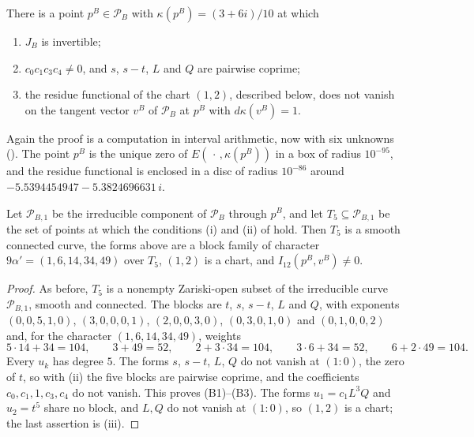 \begin{proposition}\label{prop:family52b}
There is a point $p^{B}\in\mathcal P_{B}$ with $\kappa(p^{B})=(3+6i)/10$ at
which
\begin{enumerate}[label=\textup{(\roman*)}]
\item $J_{B}$ is invertible;
\item $c_{0}c_{1}c_{3}c_{4}\ne0$, and $s$, $s-t$, $L$ and $Q$ are pairwise
coprime;
\item the residue functional of the chart $(1,2)$, described below, does
not vanish on the tangent vector $v^{B}$ of $\mathcal P_{B}$ at $p^{B}$ with
$d\kappa(v^{B})=1$.
\end{enumerate}
\end{proposition}

Again the proof is a computation in interval arithmetic, now with six
unknowns (). The point $p^{B}$ is the unique zero of
$E(\,\cdot\,,\kappa(p^{B}))$ in a box of radius $10^{-95}$, and the residue
functional is enclosed in a disc of radius $10^{-86}$ around
$-5.5394454947-5.3824696631\,i$.

\begin{corollary}\label{cor:family52b}
Let $\mathcal P_{B,1}$ be the irreducible component of $\mathcal P_{B}$
through $p^{B}$, and let $T_{5}\subseteq\mathcal P_{B,1}$ be the set of
points at which the conditions \textup{(i)} and \textup{(ii)} of
 hold. Then $T_{5}$ is a smooth connected curve, the
forms above are a block family of character $9\alpha'=(1,6,14,34,49)$ over
$T_{5}$, $(1,2)$ is a chart, and $I_{12}(p^{B},v^{B})\ne0$.
\end{corollary}

\begin{proof}
As before, $T_{5}$ is a nonempty Zariski-open subset of the irreducible
curve $\mathcal P_{B,1}$, smooth and connected. The blocks are $t$, $s$,
$s-t$, $L$ and $Q$, with exponents $(0,0,5,1,0)$, $(3,0,0,0,1)$,
$(2,0,0,3,0)$, $(0,3,0,1,0)$ and $(0,1,0,0,2)$ and, for the character
$(1,6,14,34,49)$, weights
\[
  5\cdot14+34=104,\qquad 3+49=52,\qquad 2+3\cdot34=104,\qquad 3\cdot6+34=52,
  \qquad 6+2\cdot49=104 .
\]
Every $u_{k}$ has degree $5$. The forms $s$, $s-t$, $L$, $Q$ do not vanish
at $(1:0)$, the zero of $t$, so with (ii) the five blocks are pairwise
coprime, and the coefficients $c_{0},c_{1},1,c_{3},c_{4}$ do not vanish.
This proves (B1)--(B3). The forms $u_{1}=c_{1}L^{3}Q$ and $u_{2}=t^{5}$
share no block, and $L,Q$ do not vanish at $(1:0)$, so $(1,2)$ is a chart;
the last assertion is (iii).
\end{proof}

